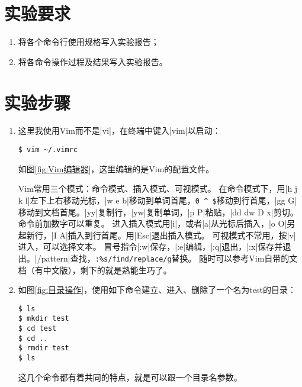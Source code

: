 \documentclass[cs4size,a4paper,nofonts]{ctexart}
\begin{document}
\section{实验要求}
\begin{enumerate}
\item 将各个命令行使用规格写入实验报告；
\item 将各命令操作过程及结果写入实验报告。
\end{enumerate}

\section{实验步骤}

\begin{enumerate}[label={(\arabic*)}]

\item 这里我使用Vim而不是|vi|，在终端中键入|vim|以启动：

\begin{Verbatim}
$ vim ~/.vimrc
\end{Verbatim}

\begin{figure}[htp]
\end{figure}

如图\ref{fig:Vim编辑器}，这里编辑的是Vim的配置文件。

Vim常用三个模式：命令模式、插入模式、可视模式。
在命令模式下，用|h j k l|左下上右移动光标，|w e b|移动到单词首尾，\verb+0 ^ $+移动到行首尾，|gg G|移动到文档首尾。|yy|复制行，|yw|复制单词，|p P|粘贴，|dd dw D x|剪切。命令前加数字可以重复。
进入插入模式用|i|，或者|a|从光标后插入，|o O|另起新行，|I A|插入到行首尾。用|Esc|退出插入模式。
可视模式不常用，按|v|进入，可以选择文本。
冒号指令|:w|保存，|:e|编辑，|:q|退出，|:x|保存并退出。|/pattern|查找，\verb+:%s/find/replace/g+替换。
随时可以参考Vim自带的文档（有中文版），剩下的就是熟能生巧了。

\item 如图\ref{fig:目录操作}，使用如下命令建立、进入、删除了一个名为test的目录：

\begin{Verbatim}
$ ls
$ mkdir test
$ cd test
$ cd ..
$ rmdir test
$ ls
\end{Verbatim}

这几个命令都有着共同的特点，就是可以跟一个目录名参数。

\begin{figure}[htp]
\end{figure}


\end{enumerate}
\end{document}

